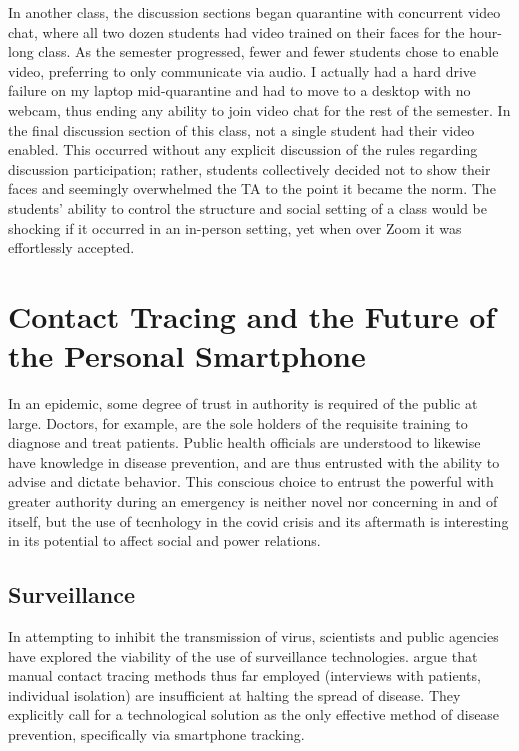 \documentclass[russian,american]{../../../coursework}
\begin{document}
In another class, the discussion sections began quarantine with concurrent video
chat, where all two dozen students had video trained on their faces for the
hour-long class. As the semester progressed, fewer and fewer students chose to
enable video, preferring to only communicate via audio. I actually had a hard
drive failure on my laptop mid-quarantine
and had to move to a desktop with no webcam, thus ending any ability to join
video chat for the rest of the semester.
In the final discussion section of this class, not a single student had their
video enabled. This occurred without any explicit discussion of the rules regarding
discussion participation; rather, students collectively decided not to show their
faces and seemingly overwhelmed the TA to the point it became the norm.
The students' ability to control the structure and social setting of a class would
be shocking if it occurred in an in-person setting, yet when over Zoom it was 
effortlessly accepted.

\section{Contact Tracing and the Future of the Personal Smartphone}

In an epidemic, some degree of trust in authority is required of the
public at large. Doctors, for example, are the sole holders of the
requisite training to diagnose and treat patients. Public health officials
are understood to likewise have knowledge in disease prevention, and are
thus entrusted with the ability to advise and dictate behavior. This
conscious choice to entrust the powerful with greater authority during an
emergency is neither novel nor concerning in and of itself, but the use of tecnhology in
the \ac{covid} crisis and its aftermath is interesting in its potential to
affect social and power relations.

\subsection{Surveillance}

In attempting to inhibit the transmission of \ac{virus}, scientists and public
agencies have explored the viability of the use of surveillance technologies.
\textcite{Ferretti2020} argue that manual contact tracing methods thus far employed
(interviews with patients, individual isolation) are insufficient at halting the
spread of disease. They explicitly call for a technological solution as the only
effective method of disease prevention, specifically via smartphone tracking.
\end{document}
